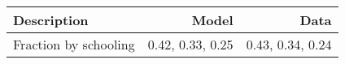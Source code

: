 \begin{tabular}{lrr}
\hline
Description & Model  & Data  \\
\hline
Fraction by schooling & 0.42, 0.33, 0.25  & 0.43, 0.34, 0.24  \\
\hline
\end{tabular}%
